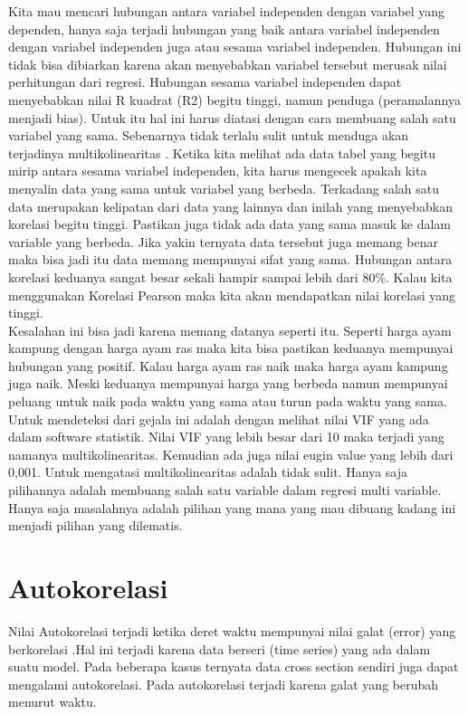 \documentclass[
]{book}
\theoremstyle{definition}
\theoremstyle{definition}
\theoremstyle{definition}
\theoremstyle{definition}
\theoremstyle{remark}
\begin{document}
Kita mau mencari hubungan antara variabel independen dengan variabel yang dependen, hanya saja terjadi hubungan yang baik antara variabel independen dengan variabel independen juga atau sesama variabel independen. Hubungan ini tidak bisa dibiarkan karena akan menyebabkan variabel tersebut merusak nilai perhitungan dari regresi.
Hubungan sesama variabel independen dapat menyebabkan nilai R kuadrat (R2) begitu tinggi, namun penduga (peramalannya menjadi bias). Untuk itu hal ini harus diatasi dengan cara membuang salah satu variabel yang sama.
Sebenarnya tidak terlalu sulit untuk menduga akan terjadinya multikolinearitas . Ketika kita melihat ada data tabel yang begitu mirip antara sesama variabel independen, kita harus mengecek apakah kita menyalin data yang sama untuk variabel yang berbeda. Terkadang salah satu data merupakan kelipatan dari data yang lainnya dan inilah yang menyebabkan korelasi begitu tinggi. Pastikan juga tidak ada data yang sama masuk ke dalam variable yang berbeda. Jika yakin ternyata data tersebut juga memang benar maka bisa jadi itu data memang mempunyai sifat yang sama. Hubungan antara korelasi keduanya sangat besar sekali hampir sampai lebih dari 80\%. Kalau kita menggunakan Korelasi Pearson maka kita akan mendapatkan nilai korelasi yang tinggi.\\
Kesalahan ini bisa jadi karena memang datanya seperti itu. Seperti harga ayam kampung dengan harga ayam ras maka kita bisa pastikan keduanya mempunyai hubungan yang positif. Kalau harga ayam ras naik maka harga ayam kampung juga naik. Meski keduanya mempunyai harga yang berbeda namun mempunyai peluang untuk naik pada waktu yang sama atau turun pada waktu yang sama.
Untuk mendeteksi dari gejala ini adalah dengan melihat nilai VIF yang ada dalam software statistik. Nilai VIF yang lebih besar dari 10 maka terjadi yang namanya multikolinearitas. Kemudian ada juga nilai eugin value yang lebih dari 0,001.
Untuk mengatasi multikolinearitas adalah tidak sulit. Hanya saja pilihannya adalah membuang salah satu variable dalam regresi multi variable. Hanya saja masalahnya adalah pilihan yang mana yang mau dibuang kadang ini menjadi pilihan yang dilematis.

\hypertarget{autokorelasi}{%
\section{Autokorelasi}\label{autokorelasi}}

Nilai Autokorelasi terjadi ketika deret waktu mempunyai nilai galat (error) yang berkorelasi .Hal ini terjadi karena data berseri (time series) yang ada dalam suatu model. Pada beberapa kasus ternyata data cross section sendiri juga dapat mengalami autokorelasi. Pada autokorelasi terjadi karena galat yang berubah menurut waktu.
\end{document}
